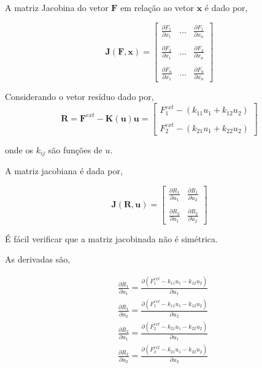 \documentclass[12pt,a4paper]{article}
\begin{document}
A matriz Jacobina do vetor $\mathbf{F}$ em relação ao vetor $\mathbf{x}$ é dado por, 

\begin{equation}
\mathbf{J}(\mathbf{F}, \mathbf{x}) = 
\begin{bmatrix}
\frac{\partial F_1}{\partial x_1} & ... & \frac{\partial F_1}{\partial x_n}\\ 
\\
\frac{\partial F_2}{\partial x_1} & ... & \frac{\partial F_2}{\partial x_n}\\ 
\\
\frac{\partial F_n}{\partial x_1} & ... & \frac{\partial F_n}{\partial x_n}
\end{bmatrix}
\end{equation}

\noindent
Considerando o vetor resíduo dado por,
\begin{equation}
\mathbf{R} = \mathbf{F}^{ext} - \mathbf{K}(\mathbf{u})\mathbf{u} =
\begin{bmatrix}
F^{ext}_1 - (k_{11}u_1 + k_{12}u_2)\\ 
\\
F^{ext}_2 - (k_{21}u_1 + k_{22}u_2) 
\end{bmatrix}
\end{equation}

\noindent
onde os $k_{ij}$ são funções de $u$. 

A matriz jacobiana é dada por,

\begin{equation}
\mathbf{J}(\mathbf{R}, \mathbf{u}) = 
\begin{bmatrix}
\frac{\partial R_1}{\partial u_1}& \frac{\partial R_1}{\partial u_2}\\ 
\\
\frac{\partial R_2}{\partial u_1}& \frac{\partial R_2}{\partial u_2} 
\end{bmatrix}
\end{equation}

\noindent
É fácil verificar que a matriz jacobinada não é simétrica.

As derivadas são,

\begin{align}
&\frac{\partial R_1}{\partial u_1} = \frac{\partial (F^{ext}_1 - k_{11} u_1 - k_{12} u_2)}{\partial u_1}\\ 
&\frac{\partial R_1}{\partial u_2} = \frac{\partial (F^{ext}_1 - k_{11} u_1 - k_{12} u_2)}{\partial u_2}\\ 
&\frac{\partial R_2}{\partial u_1} = \frac{\partial (F^{ext}_2 - k_{21} u_1 - k_{22} u_2)}{\partial u_1}\\  
&\frac{\partial R_2}{\partial u_2} = \frac{\partial (F^{ext}_2 - k_{21} u_1 - k_{22} u_2)}{\partial u_2} 
\end{align}
\end{document}
